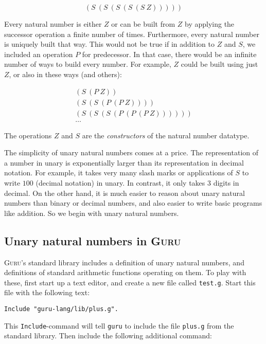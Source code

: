 \documentclass{book}[12pt]
\newcommand{\guru}[0]{\textsc{Guru}}
\begin{document}
\[ (S\ (S\ (S\ (S\ (S\ Z))))) \]

Every natural number is either $Z$ or can be built from $Z$ by
applying the successor operation a finite number of times.
Furthermore, every natural number is uniquely built that way.  This
would not be true if in addition to $Z$ and $S$, we included an
operation $P$ for predecessor.  In that case, there would be an
infinite number of ways to build every number.  For example, $Z$ could
be built using just $Z$, or also in these ways (and others):

\[ 
\begin{array}{l}
(S\ (P\ Z)) \\
(S\ (S\ (P\ (P\ Z)))) \\
(S\ (S\ (S\ (P\ (P\ (P\ Z)))))) \\
\ldots
\end{array}
\]

\noindent The operations $Z$ and $S$ are the \emph{constructors} of
the natural number datatype.

The simplicity of unary natural numbers comes at a price.  The
representation of a number in unary is exponentially larger than its
representation in decimal notation.  For example, it takes very many
slash marks or applications of $S$ to write $100$ (decimal notation)
in unary.  In contrast, it only takes 3 digits in decimal.  On the
other hand, it is much easier to reason about unary natural numbers
than binary or decimal numbers, and also easier to write basic
programs like addition.  So we begin with unary natural numbers.

\subsection{Unary natural numbers in \guru}
\label{ch2:natguru}

\guru's standard library includes a definition of unary natural
numbers, and definitions of standard arithmetic functions operating on
them.  To play with these, first start up a text editor, and create a
new file called \texttt{test.g}.  Start this file with the following
text:

\begin{verbatim}
Include "guru-lang/lib/plus.g".
\end{verbatim}

\noindent This \texttt{Include}-command will tell \texttt{guru} to
include the file \texttt{plus.g} from the standard library.  Then
include the following additional command:
\end{document}
